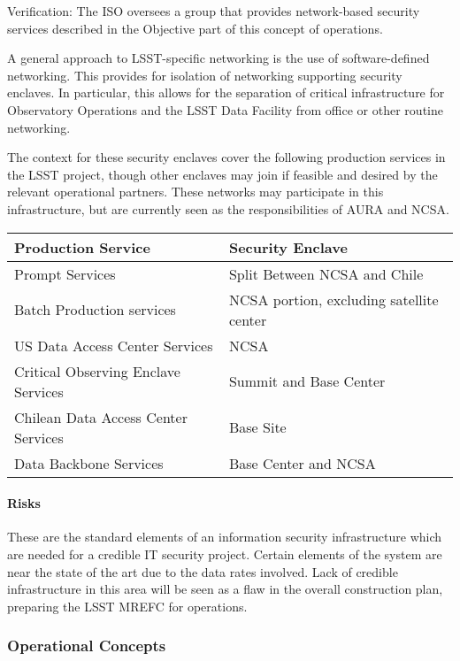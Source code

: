 Verification: The ISO oversees a group that provides network-based security
services described in the Objective part of this concept of operations.

A general approach to LSST-specific networking is the use of software-defined
networking. This provides for isolation of networking supporting security enclaves.
In particular, this allows for the separation of critical infrastructure for
Observatory Operations and the LSST Data Facility from office or other routine
networking.

The context for these security enclaves cover the following production services
in the LSST project, though other enclaves may join if feasible and desired by
the relevant operational partners. These networks may participate in this
infrastructure, but are currently seen as the responsibilities of AURA and NCSA.

\begin{longtable}{|p{}|p{}|} \hline
\textbf{Production Service} & \textbf{Security Enclave} \\\hline
Prompt Services & Split Between NCSA and Chile  \\\hline
Batch Production services & NCSA portion, excluding satellite center \\\hline
US Data Access Center Services & NCSA \\\hline
Critical Observing Enclave Services & Summit and Base Center \\\hline
Chilean Data Access Center Services & Base Site \\\hline
Data Backbone Services & Base Center and NCSA \\\hline
\end{longtable}

\paragraph{Risks}

These are the standard elements of an information security infrastructure which
are needed for a credible IT security project. Certain elements of the system
are near the state of the art due to the data rates involved. Lack of credible
infrastructure in this area will be seen as a flaw in the overall construction
plan, preparing the LSST MREFC for operations.

\subsubsection{Operational Concepts}

